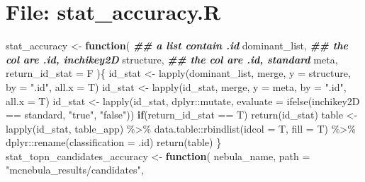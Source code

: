 \documentclass[
]{article}
\newenvironment{Shaded}{\begin{snugshade}}{\end{snugshade}}
\newcommand{\AttributeTok}[1]{\textcolor[rgb]{0.77,0.63,0.00}{#1}}
\newcommand{\ControlFlowTok}[1]{\textcolor[rgb]{0.13,0.29,0.53}{\textbf{#1}}}
\newcommand{\DocumentationTok}[1]{\textcolor[rgb]{0.56,0.35,0.01}{\textbf{\textit{#1}}}}
\newcommand{\FunctionTok}[1]{\textcolor[rgb]{0.00,0.00,0.00}{#1}}
\newcommand{\NormalTok}[1]{#1}
\newcommand{\OtherTok}[1]{\textcolor[rgb]{0.56,0.35,0.01}{#1}}
\newcommand{\SpecialCharTok}[1]{\textcolor[rgb]{0.00,0.00,0.00}{#1}}
\newcommand{\StringTok}[1]{\textcolor[rgb]{0.31,0.60,0.02}{#1}}
\begin{document}
\hypertarget{file-stat_accuracy.r}{%
\section{File: stat\_accuracy.R}\label{file-stat_accuracy.r}}

\begin{Shaded}
\begin{Highlighting}[]
\NormalTok{stat\_accuracy }\OtherTok{\textless{}{-}} 
  \ControlFlowTok{function}\NormalTok{(}
           \DocumentationTok{\#\# a list contain .id}
\NormalTok{           dominant\_list,}
           \DocumentationTok{\#\# the col are .id, inchikey2D}
\NormalTok{           structure,}
           \DocumentationTok{\#\# the col are .id, standard}
\NormalTok{           meta,}
           \AttributeTok{return\_id\_stat =}\NormalTok{ F}
\NormalTok{           )\{}
\NormalTok{    id\_stat }\OtherTok{\textless{}{-}} \FunctionTok{lapply}\NormalTok{(dominant\_list, merge, }\AttributeTok{y =}\NormalTok{ structure,}
                             \AttributeTok{by =} \StringTok{".id"}\NormalTok{,}
                             \AttributeTok{all.x =}\NormalTok{ T)}
\NormalTok{    id\_stat }\OtherTok{\textless{}{-}} \FunctionTok{lapply}\NormalTok{(id\_stat, merge, }\AttributeTok{y =}\NormalTok{ meta,}
                             \AttributeTok{by =} \StringTok{".id"}\NormalTok{, }\AttributeTok{all.x =}\NormalTok{ T)}
\NormalTok{    id\_stat }\OtherTok{\textless{}{-}} \FunctionTok{lapply}\NormalTok{(id\_stat, dplyr}\SpecialCharTok{::}\NormalTok{mutate,}
                             \AttributeTok{evaluate =} \FunctionTok{ifelse}\NormalTok{(inchikey2D }\SpecialCharTok{==}\NormalTok{ standard, }\StringTok{"true"}\NormalTok{, }\StringTok{"false"}\NormalTok{))}
    \ControlFlowTok{if}\NormalTok{(return\_id\_stat }\SpecialCharTok{==}\NormalTok{ T)}
      \FunctionTok{return}\NormalTok{(id\_stat)}
\NormalTok{    table }\OtherTok{\textless{}{-}} \FunctionTok{lapply}\NormalTok{(id\_stat, table\_app) }\SpecialCharTok{\%\textgreater{}\%}
\NormalTok{      data.table}\SpecialCharTok{::}\FunctionTok{rbindlist}\NormalTok{(}\AttributeTok{idcol =}\NormalTok{ T, }\AttributeTok{fill =}\NormalTok{ T) }\SpecialCharTok{\%\textgreater{}\%}
\NormalTok{      dplyr}\SpecialCharTok{::}\FunctionTok{rename}\NormalTok{(}\AttributeTok{classification =}\NormalTok{ .id)}
    \FunctionTok{return}\NormalTok{(table)}
\NormalTok{  \}}
\NormalTok{stat\_topn\_candidates\_accuracy }\OtherTok{\textless{}{-}} 
  \ControlFlowTok{function}\NormalTok{(}
\NormalTok{           nebula\_name,}
           \AttributeTok{path =} \StringTok{"mcnebula\_results/candidates"}\NormalTok{,}

\end{Highlighting}
\end{Shaded}
\end{document}
